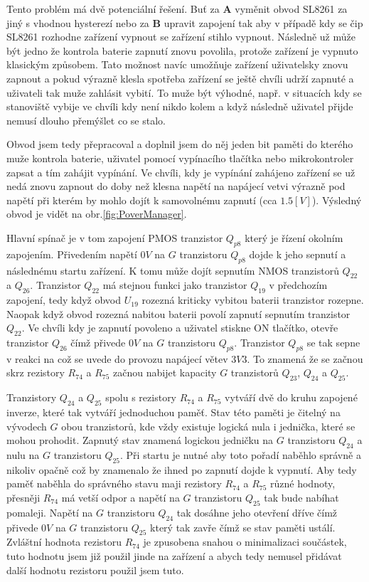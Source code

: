 Tento problém má dvě potenciální řešení.
Buť za {\bf A} vyměnit obvod SL8261 za jiný s vhodnou hysterezí nebo za {\bf B} upravit zapojení tak aby v případě kdy se čip SL8261 rozhodne zařízení vypnout se zařízení stihlo vypnout.
Následně už může být jedno že kontrola baterie zapnutí znovu povolila, protože zařízení je vypnuto klasickým způsobem.
Tato možnost navíc umožňuje zařízení uživatelsky znovu zapnout a pokud výrazně klesla spotřeba zařízení se ještě chvíli udrží zapnuté a uživateli tak muže zahlásit vybití.
To muže být výhodné, např. v situacích kdy se stanoviště vybije ve chvíli kdy není nikdo kolem a když následně uživatel přijde nemusí dlouho přemýšlet co se stalo.

Obvod jsem tedy přepracoval a doplnil jsem do něj jeden bit paměti do kterého muže kontrola baterie, uživatel pomocí vypínacího tlačítka nebo mikrokontroler zapsat a tím zahájit vypínání.
Ve chvíli, kdy je vypínání zahájeno zařízení se už nedá znovu zapnout do doby než klesna napětí na napájecí vetvi výrazně pod napětí při kterém by mohlo dojít k samovolnému zapnutí (cca \(1.5 [V]\)).
Výsledný obvod je vidět na obr.\ref{fig:PoverManager}.

Hlavní spínač je v tom zapojení PMOS tranzistor \(Q_{p8}\) který je řízení okolním zapojením.
Přivedením napětí \(0 V\) na \(G\) tranzistoru \(Q_{p8}\) dojde k jeho sepnutí a následnému startu zařízení.
K tomu může dojít sepnutím NMOS tranzistorů \(Q_{22}\) a \(Q_{26}\).
Tranzistor \(Q_{22}\) má stejnou funkci jako tranzistor \(Q_{19}\) v předchozím zapojení, tedy když obvod \(U_{19}\) rozezná kriticky vybitou baterii tranzistor rozepne.
Naopak když obvod rozezná nabitou baterii povolí zapnutí sepnutím tranzistor \(Q_{22}\).
Ve chvíli kdy je zapnutí povoleno a uživatel stiskne ON tlačítko, otevře tranzistor \(Q_{26}\) čímž přivede \(0 V\) na \(G\) tranzistoru \(Q_{p8}\).
Tranzistor \(Q_{p8}\) se tak sepne v reakci na což se uvede do provozu napájecí větev \(3V3\).
To znamená že se začnou skrz rezistory \(R_{74}\) a \(R_{75}\) začnou nabijet kapacity \(G\) tranzistorů \(Q_{23}\), \(Q_{24}\) a \(Q_{25}\).

Tranzistory \(Q_{24}\) a \(Q_{25}\) spolu s rezistory \(R_{74}\) a \(R_{75}\) vytváří dvě do kruhu zapojené inverze, které tak vytváří jednoduchou paměť.
Stav této paměti je čitelný na vývodech \(G\) obou tranzistorů, kde vždy existuje logická nula i jednička, které se mohou prohodit.
Zapnutý stav znamená logickou jedničku na \(G\) tranzistoru \(Q_{24}\) a nulu na \(G\) tranzistoru \(Q_{25}\).
Při startu je nutné aby toto pořadí naběhlo správně a nikoliv opačně což by znamenalo že ihned po zapnutí dojde k vypnutí.
Aby tedy paměť naběhla do správného stavu maji rezistory \(R_{74}\) a \(R_{75}\) různé hodnoty, přesněji \(R_{74}\) má vetší odpor a napětí na \(G\) tranzistoru \(Q_{25}\) tak bude nabíhat pomaleji.
Napětí na \(G\) tranzistoru \(Q_{24}\) tak dosáhne jeho otevření dříve čímž přivede \(0 V\) na \(G\) tranzistoru \(Q_{25}\) který tak zavře čímž se stav paměti ustálí.
Zvláštní hodnota rezistoru \(R_{74}\) je zpusobena snahou o minimalizaci součástek, tuto hodnotu jsem již použil jinde na zařízení a abych tedy nemusel přidávat další hodnotu rezistoru použil jsem tuto.

